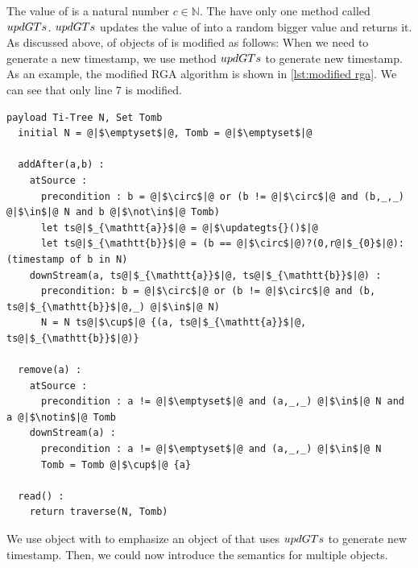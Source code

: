 The value of \gts{} is a natural number $c \in \mathbb{N}$. The \gts{} have only one method called $updGTs{}$. $updGTs{}$ updates the value of \gts{} into a random bigger value and returns it. As discussed above, \crdtimp{} of objects of \tonelin{} is modified as follows: When we need to generate a new timestamp, we use method $updGTs{}$ to generate new timestamp. As an example, the modified RGA algorithm is shown in \autoref{lst:modified rga}. We can see that only line $7$ is modified.

\begin{lstlisting}[caption={Pseudo-code of the Modified RGA}, captionpos=b,label={lst:modified rga}]
  payload Ti-Tree N, Set Tomb
  initial N = @|$\emptyset$|@, Tomb = @|$\emptyset$|@

  addAfter(a,b) :
    atSource :
      precondition : b = @|$\circ$|@ or (b != @|$\circ$|@ and (b,_,_) @|$\in$|@ N and b @|$\not\in$|@ Tomb)
      let ts@|$_{\mathtt{a}}$|@ = @|$\updategts{}()$|@
      let ts@|$_{\mathtt{b}}$|@ = (b == @|$\circ$|@)?(0,r@|$_{0}$|@):(timestamp of b in N)
    downStream(a, ts@|$_{\mathtt{a}}$|@, ts@|$_{\mathtt{b}}$|@) :
      precondition: b = @|$\circ$|@ or (b != @|$\circ$|@ and (b, ts@|$_{\mathtt{b}}$|@,_) @|$\in$|@ N)
      N = N ts@|$\cup$|@ {(a, ts@|$_{\mathtt{a}}$|@, ts@|$_{\mathtt{b}}$|@)}

  remove(a) :
    atSource :
      precondition : a != @|$\emptyset$|@ and (a,_,_) @|$\in$|@ N and a @|$\notin$|@ Tomb
    downStream(a) :
      precondition : a != @|$\emptyset$|@ and (a,_,_) @|$\in$|@ N
      Tomb = Tomb @|$\cup$|@ {a}

  read() :
    return traverse(N, Tomb)
\end{lstlisting}

We use object with \gts{} to emphasize an object of \tonelin{} that uses $updGTs{}$ to generate new timestamp. Then, we could now introduce the semantics for multiple objects.

